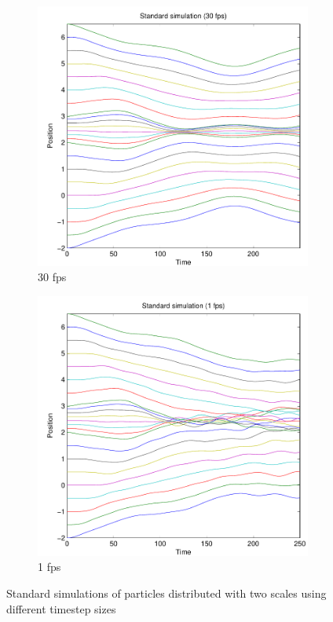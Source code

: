 \documentclass[11pt]{article}
\begin{document}
\begin{figure}[H]
    \begin{subfigure}[t]{0.5\textwidth}
        \includegraphics[width=\textwidth]{../images/standard_multiscale_30fps.pdf}
        \caption{30 fps}
        \label{fig:std_multi_30fps}
    \end{subfigure}
    \begin{subfigure}[t]{0.5\textwidth}
        \includegraphics[width=\textwidth]{../images/standard_multiscale_1fps.pdf}
        \caption{1 fps}
        \label{fig:std_multi_1fps}
    \end{subfigure}
    \caption{Standard simulations of particles distributed with two scales using
    different timestep sizes}
    \label{fig:std}
\end{figure}
\end{document}
